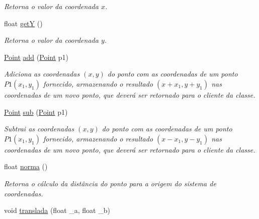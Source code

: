 \begin{DoxyCompactItemize}
\begin{DoxyCompactList}\small\item\em Retorna o valor da coordenada $x$. \end{DoxyCompactList}\item 
float \hyperlink{class_point_a3cccbca94719ddde353cce86ce0e2f64}{getY} ()\hypertarget{class_point_a3cccbca94719ddde353cce86ce0e2f64}{}\label{class_point_a3cccbca94719ddde353cce86ce0e2f64}

\begin{DoxyCompactList}\small\item\em Retorna o valor da coordenada $y$. \end{DoxyCompactList}\item 
\hyperlink{class_point}{Point} \hyperlink{class_point_a9dbea84b07b0a8ec3bbb9e58b3d15899}{add} (\hyperlink{class_point}{Point} p1)\hypertarget{class_point_a9dbea84b07b0a8ec3bbb9e58b3d15899}{}\label{class_point_a9dbea84b07b0a8ec3bbb9e58b3d15899}

\begin{DoxyCompactList}\small\item\em Adiciona as coordenadas $(x,y)$ do ponto com as coordenadas de um ponto $P1(x_1,y_1)$ fornecido, armazenando o resultado $(x+x_1,y+y_1)$ nas coordenadas de um novo ponto, que deverá ser retornado para o cliente da classe. \end{DoxyCompactList}\item 
\hyperlink{class_point}{Point} \hyperlink{class_point_a9cf2c53b0a4e6282a6712824bb4e9b00}{sub} (\hyperlink{class_point}{Point} p1)\hypertarget{class_point_a9cf2c53b0a4e6282a6712824bb4e9b00}{}\label{class_point_a9cf2c53b0a4e6282a6712824bb4e9b00}

\begin{DoxyCompactList}\small\item\em Subtrai as coordenadas $(x,y)$ do ponto com as coordenadas de um ponto $P1(x_1,y_1)$ fornecido, armazenando o resultado $(x−x_1,y−y_1)$ nas coordenadas de um novo ponto, que deverá ser retornado para o cliente da classe. \end{DoxyCompactList}\item 
float \hyperlink{class_point_abd2618d1f505d9392893273a66e7c9b2}{norma} ()\hypertarget{class_point_abd2618d1f505d9392893273a66e7c9b2}{}\label{class_point_abd2618d1f505d9392893273a66e7c9b2}

\begin{DoxyCompactList}\small\item\em Retorna o cálculo da distância do ponto para a origem do sistema de coordenadas. \end{DoxyCompactList}\item 
void \hyperlink{class_point_aaa6b1904e9e73484651bb5b1191e0f18}{translada} (float \+\_\+a, float \+\_\+b)\hypertarget{class_point_aaa6b1904e9e73484651bb5b1191e0f18}{}\label{class_point_aaa6b1904e9e73484651bb5b1191e0f18}


\end{DoxyCompactItemize}
